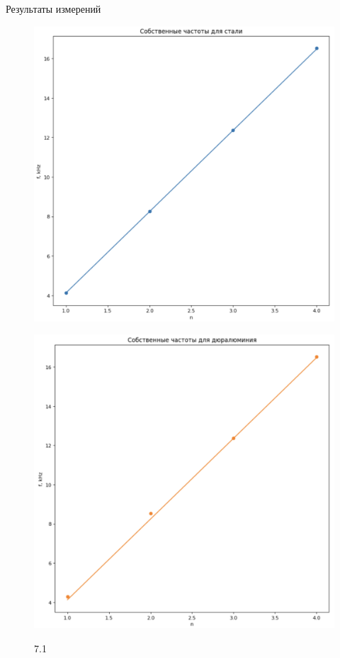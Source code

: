 \documentclass[xcolor=table]{beamer}
\begin{document}
\begin{frame}{Результаты измерений}
    \begin{figure}[ht]
        \begin{spacing}{0.25}
        \begin{minipage}{.5\textwidth}
            \includegraphics[width=1.0\linewidth]{images/сталь.png}\\
            \caption{7.1}
            \label{fig:my_label}
        \end{minipage}%
        \begin{minipage}{.5\textwidth}
            \includegraphics[width=1.0\linewidth]{images/дюралюминий.png}\\

\end{minipage}
\end{spacing}
\end{figure}
\end{frame}
\end{document}
